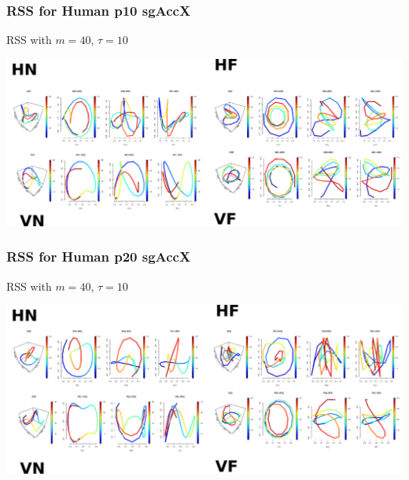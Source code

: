 \documentclass{beamer}
\begin{document}
\begin{frame}
\frametitle{RSS for Human p10 sgAccX}

RSS with $m=40$, $\tau=10$
\begin{adjustwidth}{-3em}{-3em}
\includegraphics[width=1.2\textwidth]{Humans_p10rss}
\end{adjustwidth}

\end{frame}



\begin{frame}
\frametitle{RSS for Human p20 sgAccX}

RSS with $m=40$, $\tau=10$
\begin{adjustwidth}{-3em}{-3em}
\includegraphics[width=1.2\textwidth]{Humans_p20rss}
\end{adjustwidth}

\end{frame}
\end{document}
